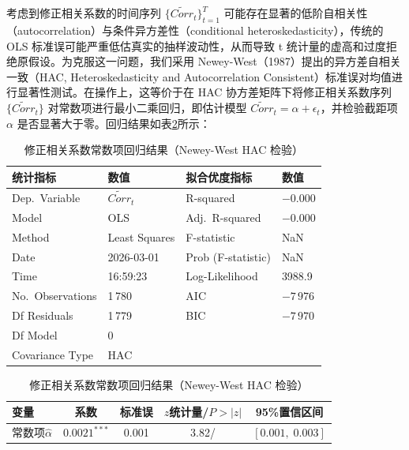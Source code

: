 \documentclass{article}
\begin{document}
考虑到修正相关系数的时间序列 $\{\widetilde{Corr}_t\}_{t=1}^{T}$ 可能存在显著的低阶自相关性（autocorrelation）与条件异方差性（conditional heteroskedasticity），传统的 OLS 标准误可能严重低估真实的抽样波动性，从而导致 t 统计量的虚高和过度拒绝原假设。为克服这一问题，我们采用 Newey-West（1987）提出的异方差自相关一致（HAC, Heteroskedasticity and Autocorrelation Consistent）标准误对均值进行显著性测试。在操作上，这等价于在 HAC 协方差矩阵下将修正相关系数序列 $\{\widetilde{Corr}_t\}$ 对常数项进行最小二乘回归，即估计模型 $\widetilde{Corr}_t = \alpha + \epsilon_t$，并检验截距项 $\alpha$ 是否显著大于零。回归结果如表\ref{tab:ols_results_hac}所示：

\begin{table}[htbp]
\centering
\caption{修正相关系数常数项回归结果（Newey-West HAC 检验）}
\label{tab:ols_results_hac}
\begin{threeparttable}
\small
\setlength{\tabcolsep}{6pt}
\renewcommand{\arraystretch}{1.15}

\begin{tabular}{@{}ll@{\hskip 24pt}ll@{}}
\toprule
\textbf{统计指标} & \textbf{数值} & \textbf{拟合优度指标} & \textbf{数值} \\
\midrule
Dep.\ Variable    & $\widetilde{Corr}_t$ & R-squared          & $-0.000$ \\
Model             & OLS                  & Adj.\ R-squared    & $-0.000$ \\
Method            & Least Squares        & F-statistic        & NaN      \\
Date              & 2026-03-01           & Prob (F-statistic) & NaN      \\
Time              & 16:59:23             & Log-Likelihood     & 3988.9   \\
No.\ Observations & 1\,780              & AIC                & $-7\,976$\\
Df Residuals      & 1\,779              & BIC                & $-7\,970$\\
Df Model          & 0                    &                    &          \\
Covariance Type   & HAC                  &                    &          \\
\bottomrule
\end{tabular}

\vspace{6pt}

\begin{tabular}{@{}lcccc@{}}
\toprule
\textbf{变量}
  & \textbf{系数}
  & \textbf{标准误}
  & \textbf{$z$统计量\;/\;$P>|z|$}
  & \textbf{95\%置信区间} \\
\midrule
常数项\;$\hat{\alpha}$
  & $0.0021^{***}$
  & 0.001
  & 3.82\;/\;0.000
  & $[0.001,\; 0.003]$ \\
\bottomrule
\end{tabular}


\end{threeparttable}
\end{table}
\end{document}
